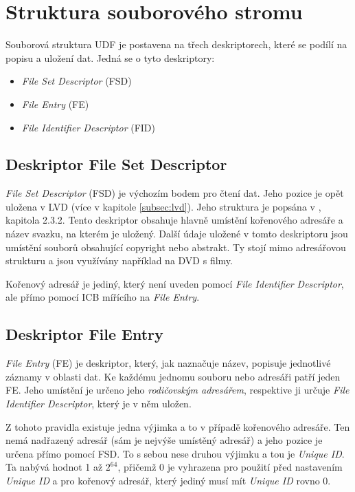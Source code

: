 \section{Struktura souborového stromu}
\label{sec:file-structure}
Souborová struktura UDF je postavena na třech deskriptorech, které se podílí na popisu a uložení dat. Jedná se o tyto deskriptory:
\begin{itemize}
    \item \textit{File Set Descriptor} (FSD)
    \item \textit{File Entry} (FE)
    \item \textit{File Identifier Descriptor} (FID)
\end{itemize}

\subsection{Deskriptor File Set Descriptor}
\label{subsec:fsd}
\textit{File Set Descriptor} (FSD) je výchozím bodem pro čtení dat. Jeho pozice je opět uložena v LVD (více v kapitole \ref{subsec:lvd}). Jeho struktura je popsána v \cite{osta-udf-0201}, kapitola 2.3.2. Tento deskriptor obsahuje hlavně umístění kořenového adresáře a název svazku, na kterém je uložený. Další údaje uložené v tomto deskriptoru jsou umístění souborů obsahující copyright nebo abstrakt. Ty stojí mimo adresářovou strukturu a jsou využívány například na DVD s filmy.

Kořenový adresář je jediný, který není uveden pomocí \textit{File Identifier Descriptor}, ale přímo pomocí ICB mířícího na \textit{File Entry}. 

\subsection{Deskriptor File Entry}
\label{subsec:fe}
\textit{File Entry} (FE) je deskriptor, který, jak naznačuje název, popisuje jednotlivé záznamy v oblasti dat. Ke každému jednomu souboru nebo adresáři patří jeden FE. Jeho umístění je určeno jeho \textit{rodičovským adresářem}, respektive ji určuje \textit{File Identifier Descriptor}, který je v něm uložen.

Z tohoto pravidla existuje jedna výjimka a to v případě kořenového adresáře. Ten nemá nadřazený adresář (sám je nejvýše umístěný adresář) a jeho pozice je určena přímo pomocí FSD. To s sebou nese druhou výjimku a tou je \textit{Unique ID}. Ta nabývá hodnot 1 až $2^{64}$, přičemž 0 je vyhrazena pro použití před nastavením \textit{Unique ID} a pro kořenový adresář, který jediný musí mít \textit{Unique ID} rovno 0.


